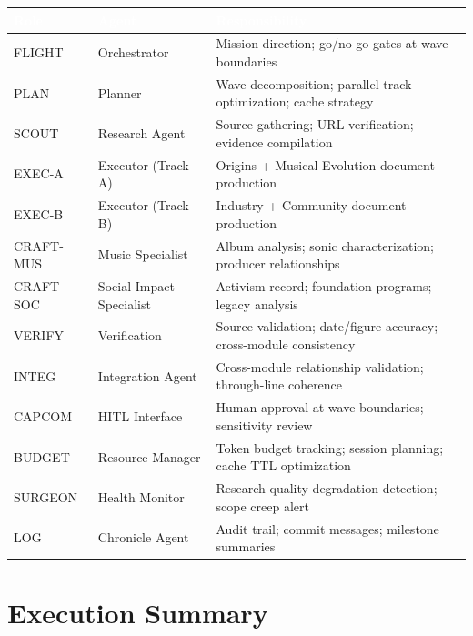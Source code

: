 \documentclass[11pt,letterpaper]{article}
\newcommand{\tableheader}[1]{\textbf{\sffamily\textcolor{white}{#1}}}
\begin{document}
\begin{center}
\begin{tabularx}{\textwidth}{L{2cm}L{3cm}X}
\toprule
{}
\tableheader{Role} & \tableheader{Agent} & \tableheader{Responsibility} \\
\midrule
FLIGHT & Orchestrator & Mission direction; go/no-go gates at wave boundaries \\
PLAN & Planner & Wave decomposition; parallel track optimization; cache strategy \\
SCOUT & Research Agent & Source gathering; URL verification; evidence compilation \\
EXEC-A & Executor (Track A) & Origins + Musical Evolution document production \\
EXEC-B & Executor (Track B) & Industry + Community document production \\
CRAFT-MUS & Music Specialist & Album analysis; sonic characterization; producer relationships \\
CRAFT-SOC & Social Impact Specialist & Activism record; foundation programs; legacy analysis \\
VERIFY & Verification & Source validation; date/figure accuracy; cross-module consistency \\
INTEG & Integration Agent & Cross-module relationship validation; through-line coherence \\
CAPCOM & HITL Interface & Human approval at wave boundaries; sensitivity review \\
BUDGET & Resource Manager & Token budget tracking; session planning; cache TTL optimization \\
SURGEON & Health Monitor & Research quality degradation detection; scope creep alert \\
LOG & Chronicle Agent & Audit trail; commit messages; milestone summaries \\
\bottomrule
\end{tabularx}
\end{center}

\section{Execution Summary}
\end{document}

